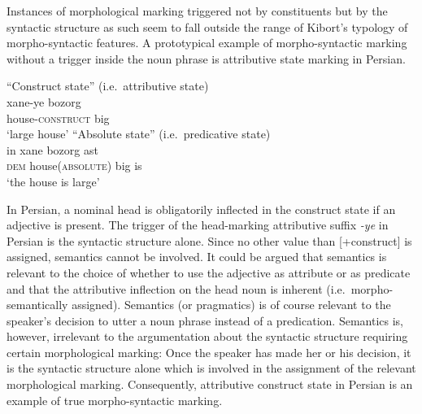 Instances of morphological marking triggered not by constituents but by the syntactic structure as such seem to fall outside the range of Kibort's typology of morpho-syntactic features. A prototypical example of morpho-syntactic marking without a trigger inside the noun phrase is attributive state marking in Persian.
\begin{exe}
\ex 
{}
\label{persian state}
\begin{xlist}
\ex 
{\rm “Construct state” (i.e.~attributive state)}\\
\gll 	xane-ye bozorg\\
	house-\textsc{construct} big\\
\glt 	‘large house’
\ex 
{\rm “Absolute state” (i.e.~predicative state)}\\
\gll	in xane bozorg ast\\
	\textsc{dem} house(\textsc{absolute}) big is\\
\glt	‘the house is large’
\end{xlist}
\end{exe}
In Persian, a nominal head is obligatorily inflected in the construct state if an adjective is present. The trigger of the head-marking attributive suffix \textit{-ye} in Persian is the syntactic structure alone. Since no other value than [+construct] is assigned, semantics cannot be involved. It could be argued that semantics is relevant to the choice of whether to use the adjective as attribute or as predicate and that the attributive inflection on the head noun is inherent (i.e.~morpho-semantically assigned). Semantics (or pragmatics) is of course relevant to the speaker's decision to utter a noun phrase instead of a predication. Semantics is, however, irrelevant to the argumentation about the syntactic structure requiring certain morphological marking: Once the speaker has made her or his decision, it is the syntactic structure alone which is involved in the assignment of the relevant morphological marking. Consequently, attributive construct state in Persian is an example of true morpho-syntactic marking.

